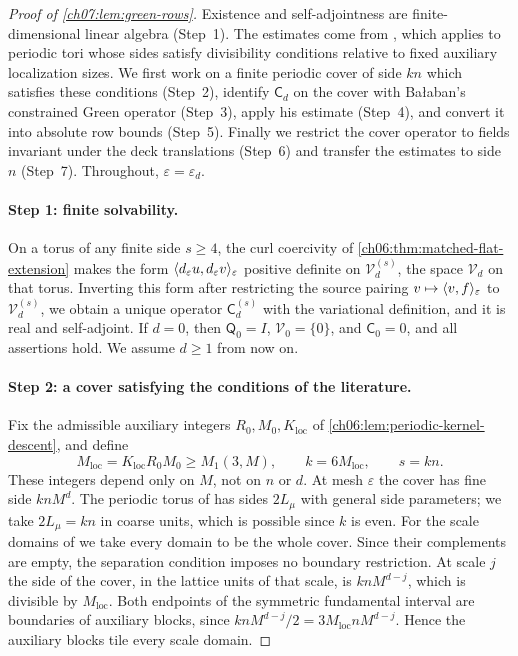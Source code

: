 \begin{proof}[Proof of \cref{ch07:lem:green-rows}]
Existence and self-adjointness are finite-dimensional linear algebra (Step~1). The estimates come from \cite[Theorem~3.13, p.~426]{Balaban1985Background}, which applies to periodic tori whose sides satisfy divisibility conditions relative to fixed auxiliary localization sizes. We first work on a finite periodic cover of side $kn$ which satisfies these conditions (Step~2), identify $\mathsf C_d$ on the cover with Ba{\l}aban's constrained Green operator (Step~3), apply his estimate (Step~4), and convert it into absolute row bounds (Step~5). Finally we restrict the cover operator to fields invariant under the deck translations (Step~6) and transfer the estimates to side $n$ (Step~7). Throughout, $\varepsilon=\varepsilon_d$.

\paragraph{Step 1: finite solvability.}
On a torus of any finite side $s\ge4$, the curl coercivity of \cref{ch06:thm:matched-flat-extension} makes the form $\langle d_\varepsilon u,d_\varepsilon v\rangle_\varepsilon$ positive definite on $\mathcal V_d^{(s)}$, the space $\mathcal V_d$ on that torus. Inverting this form after restricting the source pairing $v\mapsto\langle v,f\rangle_\varepsilon$ to $\mathcal V_d^{(s)}$, we obtain a unique operator $\mathsf C_d^{(s)}$ with the variational definition, and it is real and self-adjoint. If $d=0$, then $\mathsf Q_0=I$, $\mathcal V_0=\{0\}$, and $\mathsf C_0=0$, and all assertions hold. We assume $d\ge1$ from now on.

\paragraph{Step 2: a cover satisfying the conditions of the literature.}
Fix the admissible auxiliary integers $R_0,M_0,K_{\mathrm{loc}}$ of \cref{ch06:lem:periodic-kernel-descent}, and define
\[
 M_{\mathrm{loc}}=K_{\mathrm{loc}}R_0M_0\ge M_1(3,M),\qquad k=6M_{\mathrm{loc}},\qquad s=kn.
\]
These integers depend only on $M$, not on $n$ or $d$. At mesh $\varepsilon$ the cover has fine side $knM^d$. The periodic torus of \cite[Section~A, pp.~17--18]{Balaban1984I} has sides $2L_\mu$ with general side parameters; we take $2L_\mu=kn$ in coarse units, which is possible since $k$ is even. For the scale domains of \cite[(2.1)--(2.2), p.~224]{Balaban1984II} we take every domain to be the whole cover. Since their complements are empty, the separation condition imposes no boundary restriction. At scale $j$ the side of the cover, in the lattice units of that scale, is $knM^{d-j}$, which is divisible by $M_{\mathrm{loc}}$. Both endpoints of the symmetric fundamental interval are boundaries of auxiliary blocks, since $knM^{d-j}/2=3M_{\mathrm{loc}}nM^{d-j}$. Hence the auxiliary blocks tile every scale domain.


\end{proof}
